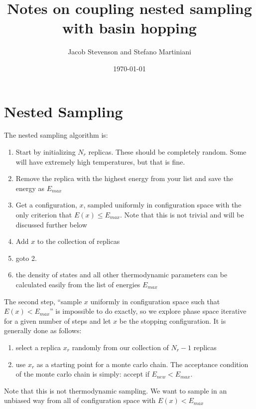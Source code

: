 \documentclass[a4paper]{article}
\title{Notes on coupling nested sampling with basin hopping}
\author{Jacob Stevenson and Stefano Martiniani}
\date{\today}
\begin{document}
\maketitle


\section{Nested Sampling}

The nested sampling algorithm is:
\begin{enumerate}
  \item Start by initializing $N_r$ replicas.  These should be completely random.  Some will have extremely high 
    temperatures, but that is fine.

  \item Remove the replica with the highest energy from your list and save the energy as $E_{max}$

  \item Get a configuration, $x$, sampled uniformly in configuration space
    with the only criterion that $E(x) \le E_{max}$.  Note that this is not trivial and will
    be discussed further below
  
  \item Add $x$ to the collection of replicas

  \item goto 2.

  \item the density of states and all other thermodynamic parameters can be calculated easily from the list of energies $E_{max}$

\end{enumerate}


The second step, ``sample $x$ uniformly in configuration space such that $E(x) < E_{max}$'' is
impossible to do exactly, so we explore phase space iterative for a given
number of steps and let $x$ be the stopping configuration.
It is generally done as follows:

\begin{enumerate}
  \item select a replica $x_r$ randomly from our collection of $N_r - 1$ replicas
  
  \item use $x_r$ as a starting point for a monte carlo chain.  The acceptance condition 
    of the monte carlo chain is simply: accept if $E_{new} < E_{max}$.  
\end{enumerate}

Note that this is not thermodynamic sampling.  We want to sample in an unbiased
way from all of configuration space with $E(x) < E_{max}$
\end{document}

